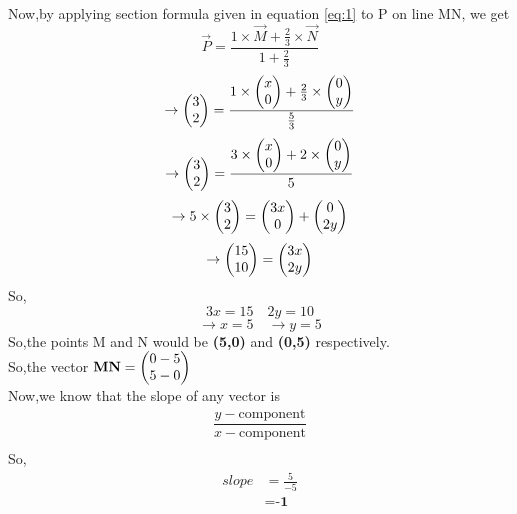 \documentclass[journal,12pt,twocolumn]{IEEEtran}
\begin{document}
Now,by applying section formula given in equation \eqref{eq:1} to P on line MN, we get\\
\begin{equation*}
    \vec{P}=\frac{1\times \vec{M}+\frac{2}{3}\times \vec{N}}{1+\frac{2}{3}}
\end{equation*}
\begin{equation*}
    \rightarrow\begin{pmatrix}3 \\ 2\end{pmatrix}=\frac{1\times \begin{pmatrix}x\\0\end{pmatrix}+\frac{2}{3}\times \begin{pmatrix}0\\y\end{pmatrix}}{\frac{5}{3}}
\end{equation*}
\begin{equation*}
\rightarrow\begin{pmatrix}3 \\ 2\end{pmatrix}=\frac{3\times \begin{pmatrix}x\\0\end{pmatrix}+2\times \begin{pmatrix}0\\y\end{pmatrix}}{5}
\end{equation*}
\begin{equation*}
    \rightarrow 5\times \begin{pmatrix}3\\2\end{pmatrix}=\begin{pmatrix}3x\\0\end{pmatrix}+\begin{pmatrix}0\\2y\end{pmatrix}
\end{equation*}
\begin{equation}
\rightarrow\begin{pmatrix}15\\10\end{pmatrix}=\begin{pmatrix}3x\\2y\end{pmatrix} 
\end{equation}
So,
\begin{equation*}
3x=15\quad 2y=10
\end{equation*}
\begin{equation}
\rightarrow x=5\quad \rightarrow y=5      
\end{equation}
So,the points M and N would be \textbf{(5,0)} and \textbf{(0,5)} respectively.\\

So,the vector $\mathbf{MN}=\begin{pmatrix}0-5\\5-0\end{pmatrix}$\\

Now,we know that the slope of any vector is
\begin{align}
    \dfrac{y-\text{component}}{x-\text{component}}\\ 
\end{align}
So,
 \begin{align}
  slope &=\frac{5}{-5}\\     
  &=\textbf{-1}             
\end{align}
\end{document}
